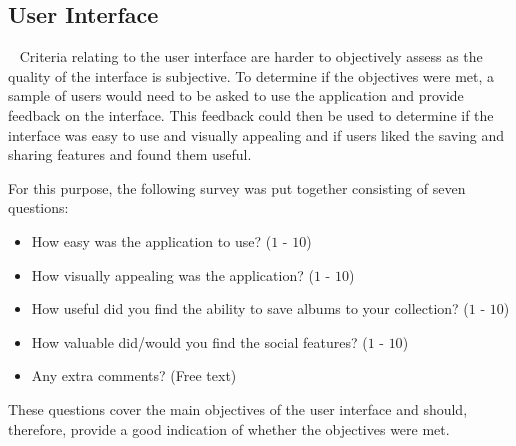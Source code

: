 \subsection{User Interface}~\label{sec:ui-tests}
Criteria relating to the user interface are harder to objectively assess as the quality of the interface is subjective. To determine if the objectives were met, a sample of users would need to be asked to use the application and provide feedback on the interface. This feedback could then be used to determine if the interface was easy to use and visually appealing and if users liked the saving and sharing features and found them useful.

For this purpose, the following survey was put together consisting of seven questions:
\begin{itemize}
    \item How easy was the application to use? ($1$ - $10$)
    \item How visually appealing was the application? ($1$ - $10$)
    \item How useful did you find the ability to save albums to your collection? ($1$ - $10$)
    \item How valuable did/would you find the social features? ($1$ - $10$)
    \item Any extra comments? (Free text)
\end{itemize}

These questions cover the main objectives of the user interface and should, therefore, provide a good indication of whether the objectives were met.

